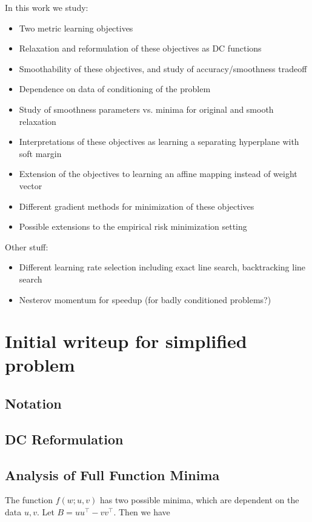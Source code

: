 \documentclass[11pt]{article}
\begin{document}
In this work we study:
\begin{itemize}
    \item Two metric learning objectives
    \item Relaxation and reformulation of these objectives as DC functions
    \item Smoothability of these objectives, and study of accuracy/smoothness tradeoff
    \item Dependence on data of conditioning of the problem
    \item Study of smoothness parameters vs. minima for original and smooth relaxation
    \item Interpretations of these objectives as learning a separating hyperplane with soft margin
    \item Extension of the objectives to learning an affine mapping instead of weight vector
    \item Different gradient methods for minimization of these objectives
    \item Possible extensions to the empirical risk minimization setting
\end{itemize}


Other stuff:
\begin{itemize}
    \item Different learning rate selection including exact line search, backtracking line search
    \item Nesterov momentum for speedup (for badly conditioned problems?)
\end{itemize}

\section{Initial writeup for simplified problem}

\subsection{Notation}

\subsection{DC Reformulation}

\subsection{Analysis of Full Function Minima}

The function $f(w; u, v)$ has two possible minima, which are dependent on the data $u, v$. Let $B = uu^{\top} - vv^{\top}$. Then we have
\end{document}
